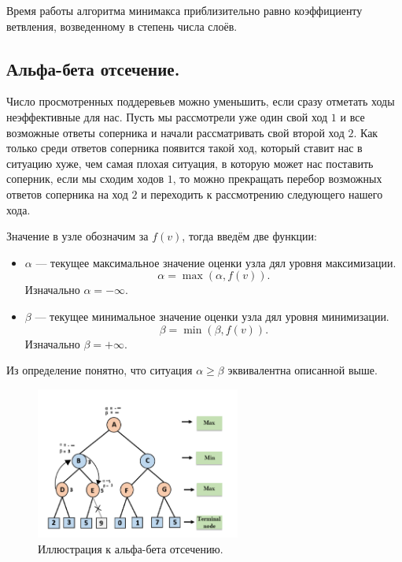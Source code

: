 \begin{remark}
  Время работы алгоритма минимакса приблизительно равно коэффициенту ветвления, возведенному в степень числа
  слоёв.
\end{remark}

\subsection{Альфа-бета отсечение.}
Число просмотренных поддеревьев можно уменьшить, если сразу отметать ходы неэффективные для нас.
Пусть мы рассмотрели уже один свой ход $1$ и все возможные ответы соперника и начали рассматривать 
свой второй ход $2$. Как только среди ответов соперника появится такой ход, который ставит нас в ситуацию
хуже, чем самая плохая ситуация, в которую может нас поставить соперник, если мы сходим ходов $1$, то 
можно прекращать перебор возможных ответов соперника на ход $2$ и переходить к рассмотрению следующего нашего
хода.

Значение в узле обозначим за $f(v)$, тогда введём две функции:
\begin{itemize}
  \item $\alpha$ --- текущее максимальное значение оценки узла дял уровня максимизации.
    \[
      \alpha = \max(\alpha, f(v))
    .\] 
    Изначально $\alpha = -\infty$.
  \item $\beta$ --- текущее минимальное значение оценки узла дял уровня минимизации.
    \[
      \beta = \min(\beta, f(v))
    .\] 
    Изначально $\beta = +\infty$.
\end{itemize}

\begin{remark}
  Из определение понятно, что ситуация $\alpha \geq \beta$ эквивалентна описанной выше.
\end{remark}

\begin{figure}[H]    
  \centering    
  \includegraphics[width=0.6\textwidth]{figures/alpabeta.png}    
  \caption*{Иллюстрация к альфа-бета отсечению.}        
\end{figure} 

